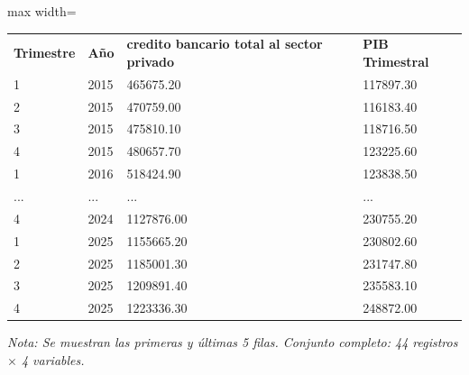 

\begin{table}[htbp]

\centering

\begin{adjustbox}{max width=\textwidth}

\begin{tabular}{llll}

\rowcolor{ThemeBackground}
\rule{0pt}{0.45cm}
\textcolor{ThemeGold}{\bfseries Trimestre} & \textcolor{ThemeGold}{\bfseries Año} & \textcolor{ThemeGold}{\bfseries credito bancario total al sector privado} & \textcolor{ThemeGold}{\bfseries PIB Trimestral} \\

1 & 2015 & 465675.20 & 117897.30 \\
2 & 2015 & 470759.00 & 116183.40 \\
3 & 2015 & 475810.10 & 118716.50 \\
4 & 2015 & 480657.70 & 123225.60 \\
1 & 2016 & 518424.90 & 123838.50 \\
... & ... & ... & ... \\
4 & 2024 & 1127876.00 & 230755.20 \\
1 & 2025 & 1155665.20 & 230802.60 \\
2 & 2025 & 1185001.30 & 231747.80 \\
3 & 2025 & 1209891.40 & 235583.10 \\
4 & 2025 & 1223336.30 & 248872.00 \\
\bottomrule
\end{tabular}

\end{adjustbox}

\vspace{0.15cm}
{\raggedright\sffamily\footnotesize\color{ThemeMuted}
\textit{Nota: Se muestran las primeras y últimas 5 filas. Conjunto completo: 44 registros $\times$ 4 variables.}}

\end{table}
